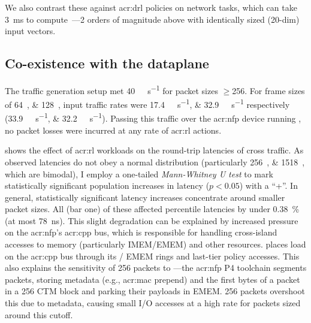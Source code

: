 We also contrast these against \gls{acr:drl} policies on network tasks, which can take \qty{3}{\milli\second} to compute~\parencite{DBLP:journals/corr/abs-1910-04054}---2 orders of magnitude above \approachshort{} with identically sized (20-dim) input vectors.

\subsection{Co-existence with the dataplane}
The traffic generation setup met \qty{40}{\giga\bit\per\second} for packet sizes $\ge$\qty{256}{\byte}.
For frame sizes of \qtylist{64;128}{\byte}, input traffic rates were \qtylist{17.4;32.9}{\giga\bit\per\second} respectively (\qtylist[per-symbol=p,sticky-per=true]{33.9;32.2}{\mega\packet\per\second}).
Passing this traffic over the \gls{acr:nfp} device running \approachshort, no packet losses were incurred at any rate of \gls{acr:rl} actions.

 shows the effect of \gls{acr:rl} workloads on the round-trip latencies of cross traffic.
As observed latencies do not obey a normal distribution (particularly \qtylist{256;1518}{\byte}, which are bimodal), I employ a one-tailed \emph{Mann-Whitney U test} to mark statistically significant population increases in latency ($p < 0.05$) with a ``+''.
In general, statistically significant latency increases concentrate around smaller packet sizes.
All (bar one) of these affected  percentile latencies by under \qty{0.38}{\percent} (at most \qty{78}{\nano\second}).
This slight degradation can be explained by increased pressure on the \gls{acr:nfp}'s \gls{acr:cpp} bus, which is responsible for handling cross-island accesses to memory (particularly IMEM/EMEM) and other resources.
\approachshort{} places load on the \gls{acr:cpp} bus through its \inring{}/\outring{} EMEM rings and last-tier policy accesses.
This also explains the sensitivity of \qty{256}{\byte} packets to \approachshort{}---the \gls{acr:nfp} P4 toolchain segments packets, storing metadata (e.g., \gls{acr:mac} prepend) and the first bytes of a packet in a \qty{256}{\byte} CTM block and parking their payloads in EMEM.
\qty{256}{\byte} packets overshoot this due to metadata, causing small I/O accesses at a high rate for packets sized around this cutoff.

